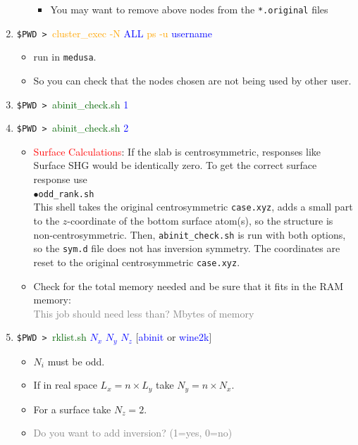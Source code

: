 \documentclass[12pt]{article}
\numberwithin{equation}{section}
\begin{document}
\begin{enumerate}
\begin{itemize}
\begin{itemize}
\item You may want to remove above nodes from the \verb=*.original= files
\end{itemize}
\end{itemize}
\item{\small \verb=$PWD > =\textcolor{orange}{cluster\_exec -N}
   \textcolor{blue}{ALL} \textcolor{orange}{ps -u} \textcolor{blue}{username}
}
\begin{itemize}
\item {\small run in \verb=medusa=.}
\item {\small So you can check that the nodes chosen are not being used by other user.}
\end{itemize}
\item \verb=$PWD > =\textcolor{darkgreen}{abinit\_check.sh} \textcolor{blue}{1} 
\item \verb=$PWD > =\textcolor{darkgreen}{abinit\_check.sh} \textcolor{blue}{2} 
\begin{itemize}
\item \textcolor{red}{Surface Calculations}: If the slab is
  centrosymmetric, responses like  Surface SHG would be identically
  zero. To get the correct surface response use\\
$\bullet$\verb=odd_rank.sh=\\
This shell takes the original centrosymmetric \verb=case.xyz=, adds a
small part to the $z$-coordinate of the bottom surface atom(s), so the
structure is non-centrosymmetric. 
Then, \verb=abinit_check.sh= is run with both options, so the
\verb=sym.d= file does not has inversion symmetry.  
The coordinates are reset to the original centrosymmetric \verb=case.xyz=.  
\item Check for the total memory needed and be sure that it fits in the RAM memory:\\
\textcolor{gray}{This job should need less than\hfill ? Mbytes of memory}
\end{itemize}
\item \verb=$PWD > =\textcolor{darkgreen}{rklist.sh}
\textcolor{blue}{ $N_x$ $N_y$ $N_z$} [\textcolor{blue}{abinit} or \textcolor{blue}{wine2k}]
\begin{itemize}

\item {\small $N_i$ must be odd.}
\item {\small If in real space $L_x=n\times L_y$ take
$N_y= n\times N_x$.}
\item {\small For a surface take $N_z=2$.}
\item 
\textcolor{gray}{Do you want to add inversion? (1=yes, 0=no)}


\end{itemize}
\end{enumerate}
\end{document}

